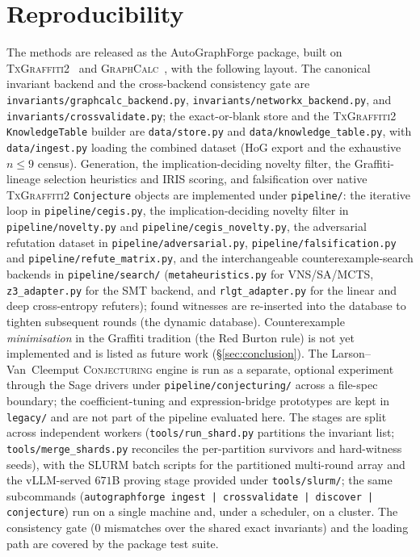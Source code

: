 \documentclass[]{ceurart}
\begin{document}


\appendix

\section{Reproducibility}

The methods are released as the \textsf{AutoGraphForge} package, built on
\textsc{TxGraffiti2}~\cite{davila2024automated} and
\textsc{GraphCalc}~\cite{davila2025graphcalc}, with the following layout. The
canonical invariant backend and the cross-backend consistency gate are
\texttt{invariants/graphcalc\_backend.py}, \texttt{invariants/networkx\_back\-end.py},
and \texttt{invariants/crossvalidate.py}; the exact-or-blank store and the
\textsc{TxGraffiti2} \texttt{KnowledgeTable} builder are
\texttt{data/store.py} and \texttt{data/knowledge\_table.py}, with
\texttt{data/ingest.py} loading the combined dataset (HoG export and the
exhaustive $n\le 9$ census). Generation, the implication-deciding novelty
filter, the Graffiti-lineage selection heuristics and IRIS scoring, and
falsification over native \textsc{TxGraffiti2} \texttt{Conjecture} objects are
implemented under \texttt{pipeline/}: the iterative loop in \texttt{pipeline/cegis.py},
the implication-deciding novelty filter in \texttt{pipeline/novelty.py} and
\texttt{pipeline/cegis\_novelty.py}, the adversarial refutation dataset in
\texttt{pipeline/adversarial.py}, \texttt{pipeline/falsification.py} and
\texttt{pipeline/refute\_matrix.py}, and the interchangeable counterexample-search
backends in \texttt{pipeline/search/} (\texttt{metaheuristics.py} for VNS/SA/MCTS,
\texttt{z3\_adapter.py} for the SMT backend, and \texttt{rlgt\_adapter.py} for the
linear and deep cross-entropy refuters); found witnesses are re-inserted into the
database to tighten subsequent rounds (the dynamic database). Counterexample
\emph{minimisation} in the Graffiti tradition (the Red Burton rule) is not yet
implemented and is listed as future work (\S\ref{sec:conclusion}). The
Larson--Van~Cleemput \textsc{Conjecturing} engine is run as a separate, optional experiment
through the Sage drivers under \texttt{pipeline/conjecturing/} across a file-spec boundary; the
coefficient-tuning and expression-bridge prototypes are kept in \texttt{legacy/} and are not part
of the pipeline evaluated here. The stages are split across independent workers
(\texttt{tools/run\_shard.py} partitions the invariant list; \texttt{tools/merge\_shards.py}
reconciles the per-partition survivors and hard-witness seeds), with the SLURM batch scripts for the
partitioned multi-round array and the vLLM-served $671$B proving stage provided under \texttt{tools/slurm/};
the same subcommands
(\texttt{autographforge ingest\,|\,crossvalidate\,|\,discover\,|\,conjecture}) run
on a single machine and, under a scheduler, on a cluster. The consistency gate ($0$ mismatches
over the shared exact invariants) and the loading path are covered by the package test suite.
\end{document}
